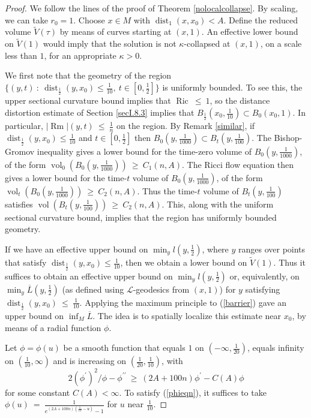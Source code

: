 \documentclass[12pt]{amsart}
\newcommand{\dist}{\operatorname{dist}}
\newcommand{\Ric}{\operatorname{Ric}}
\newcommand{\Rm}{\operatorname{Rm}}
\newcommand{\vol}{\operatorname{vol}}
\numberwithin{equation}{section}
\theoremstyle{plain}
\theoremstyle{definition}
\theoremstyle{remark}
\begin{document}
\begin{proof}
We follow the lines of the proof of Theorem \ref{nolocalcollapse}.
By scaling, we can take $r_0 = 1$. Choose $x \in M$ with
$\dist_{1}(x,x_0) < A$. Define the reduced volume 
$\tilde{V}(\tau)$ by 
means of curves starting at $(x, 1)$. An effective lower bound
on $\tilde{V}(1)$ would imply that the solution is not $\kappa$-collapsed
at $(x, 1)$, on a scale less than $1$, for an appropriate $\kappa > 0$.

We first note that the geometry of the region $\{(y, t) \: : \:
\dist_{\frac12}(y,x_0)
\le \frac{1}{10}, \: t \in [0, \frac12 ]\}$ is uniformly bounded.
To see this, the upper sectional curvature bound implies that
$\Ric \: \le \: 1$, so the 
distance distortion estimate of
Section \ref{secI.8.3} implies that 
$B_{\frac12}(x_0, \frac{1}{10}) \subset B_0(x_0, 1)$.
In particular, $|\Rm|(y,t) \: \le \: \frac{1}{n}$ 
on the region. By Remark \ref{similar},
if $\dist_{\frac12}(y,x_0)
\le \frac{1}{10}$ and $t \in [0, \frac12 ]$ then
$B_0(y, \frac{1}{1000}) \subset B_t(y, \frac{1}{100})$.
The Bishop-Gromov inequality gives a lower bound for the
time-zero volume of $B_0(y, \frac{1}{1000})$, of the form
$\vol_0(B_0(y, \frac{1}{1000})) \: \ge \: C_1(n,A)$.
The Ricci flow equation then gives a lower bound for
the time-$t$ volume of $B_0(y, \frac{1}{1000})$, of the form
$\vol_t(B_0(y, \frac{1}{1000})) \: \ge \: C_2(n,A)$.
Thus the time-$t$ volume of $B_t(y, \frac{1}{100})$ satisfies
$\vol(B_t(y, \frac{1}{100})) \: \ge \: C_2(n,A)$. 
This, along with the uniform sectional curvature bound,
implies that the region has uniformly bounded geometry.

If we have an effective upper bound on $\min_y l(y, \frac12)$,
where $y$ ranges over points that satisfy $\dist_{\frac12}(y,x_0)
\le \frac{1}{10}$, then we obtain a lower bound on 
$\tilde{V} \left( 1 \right)$.
Thus it suffices to obtain an effective upper bound on $\min_y
l(y, \frac{1}{2})$ or,
equivalently, on $\min_y \overline{L}(y, \frac{1}{2})$ 
(as defined using ${\mathcal L}$-geodesics
from $(x,1)$) for $y$ satisfying $\dist_{\frac{1}{2}}(y, x_0) \: \le \:
\frac{1}{10}$.
Applying the maximum principle to (\ref{barrier}) gave an upper bound
on $\inf_M \overline{L}$. The idea is to spatially
localize this estimate near $x_0$,
by means of a radial function $\phi$.

Let $\phi = \phi(u)$ be a smooth function that equals $1$ on
$(- \infty, \frac{1}{20})$, equals infinity on 
$(\frac{1}{10}, \infty)$ and is increasing on 
$(\frac{1}{20}, \frac{1}{10})$, with
\begin{equation} \label{phieqn}
2 (\phi^\prime)^2/\phi - \phi^{\prime \prime} \: \ge \:
(2A+100n) \phi^\prime - C(A) \phi
\end{equation}
for some constant $C(A) < \infty$.
To satisfy (\ref{phieqn}),
it suffices to take $\phi(u) \: = \: \frac{1}{e^{(2A+100n) 
(\frac{1}{10} - u)} - 1}$ for $u$ near $\frac{1}{10}$.


\end{proof}
\end{document}
